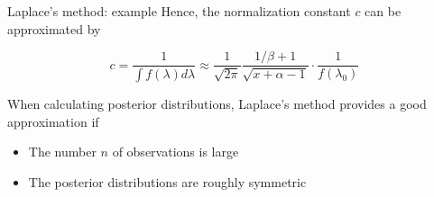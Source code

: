 \documentclass[11pt,compress,t,notes=noshow, xcolor=table]{beamer}
\begin{document}
\begin{vbframe}{Laplace's method: example}
Hence, the normalization constant $c$ can be approximated by

$$
c =\frac{1}{\int f(\lambda) d\lambda} \approx \frac{1}{\sqrt {2\pi}}\frac{1 / \beta + 1}{\sqrt{x + \alpha - 1}}\cdot \frac{1}{f(\lambda_0)}
$$








\framebreak

When calculating posterior distributions, Laplace's method provides a good approximation if

\begin{itemize}
\item The number $n$ of observations is large
\item The posterior distributions are roughly symmetric
\end{itemize}

\end{vbframe}


%
%
%
%
\end{document}
